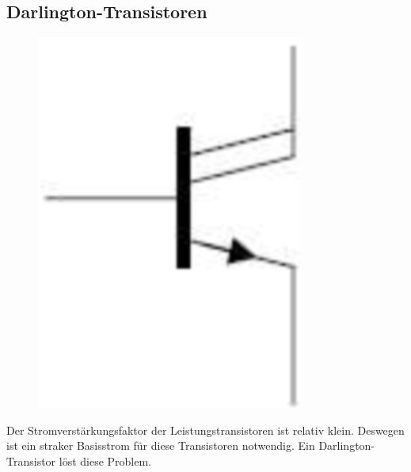\subsection{Darlington-Transistoren}
\begin{figure}
    \includegraphics[width=\linewidth]{images/darlingtonSymbol}
\end{figure}
Der Stromverstärkungsfaktor der Leistungstransistoren ist relativ klein. Deswegen ist ein straker Basisstrom für diese Transistoren notwendig. Ein Darlington-Transistor löst diese Problem.

